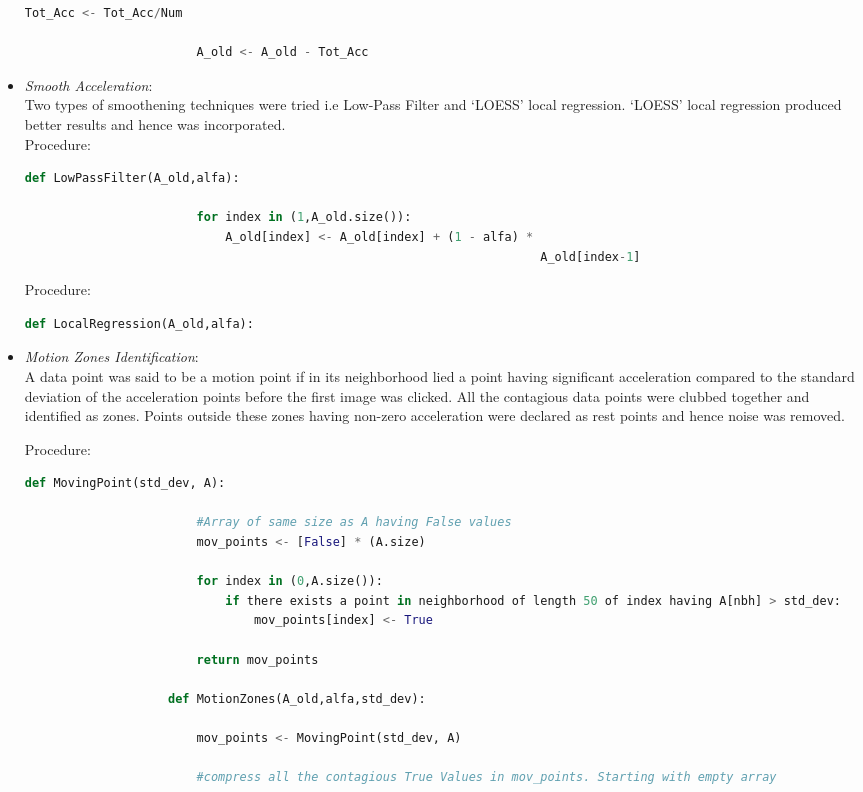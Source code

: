 \documentclass{article}
\begin{document}
\begin{itemize}
\begin{lstlisting}[language=Python, caption=StaticCorrection()]
						Tot_Acc <- Tot_Acc/Num

						A_old <- A_old - Tot_Acc	
				\end{lstlisting}
				\item \textit{Smooth Acceleration}:\\
				Two types of smoothening techniques were tried i.e Low-Pass Filter and `LOESS' local regression. `LOESS' local regression produced better results and hence was incorporated. 
				\\ Procedure:
				\begin{lstlisting}[language=Python, caption=LowPassFilter()]
					def LowPassFilter(A_old,alfa):

						for index in (1,A_old.size()):
							A_old[index] <- A_old[index] + (1 - alfa) *  
																		A_old[index-1]	
				\end{lstlisting}

				Procedure:
				\begin{lstlisting}[language=Python, caption=LocalRegression()]
					def LocalRegression(A_old,alfa):

				\end{lstlisting}

				\item \textit{Motion Zones Identification}:\\ A data point was said to be a motion point if in its neighborhood lied a point having significant acceleration compared to the standard deviation of the acceleration points before the first image was clicked. All the contagious data points were clubbed together and identified as zones. Points outside these zones having non-zero acceleration were declared as rest points and hence noise was removed.

				 Procedure:
				\begin{lstlisting}[language=Python, caption=MotionZones()]
					def MovingPoint(std_dev, A):

						#Array of same size as A having False values
						mov_points <- [False] * (A.size)

						for index in (0,A.size()):
							if there exists a point in neighborhood of length 50 of index having A[nbh] > std_dev:
								mov_points[index] <- True

						return mov_points 

					def MotionZones(A_old,alfa,std_dev):

						mov_points <- MovingPoint(std_dev, A)

						#compress all the contagious True Values in mov_points. Starting with empty array


\end{lstlisting}
\end{itemize}
\end{document}
